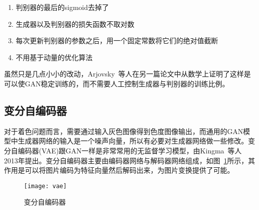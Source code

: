   \begin{enumerate}
    \item 判别器的最后的sigmoid去掉了
    \item 生成器以及判别器的损失函数不取对数
    \item 每次更新判别器的参数之后，用一个固定常数将它们的绝对值截断
    \item 不用基于动量的优化算法
  \end{enumerate}

  虽然只是几点小小的改动，Arjovsky~\cite{DBLP:journals/corr/ArjovskyB17}等人在另一篇论文中从数学上证明了这样是可以使GAN稳定训练的，而不需要人工控制生成器与判别器的训练比例。

\subsection{变分自编码器}
\label{sec:2-vae}
  
  对于着色问题而言，需要通过输入灰色图像得到色度图像输出，而通用的GAN模型中生成器网络的输入是一个噪声向量，所以有必要对生成器网络做一些修改。变分自编码器(VAE)跟GAN一样是非常常用的无监督学习模型，由Kingma~\cite{DBLP:journals/corr/KingmaW13}等人2013年提出。变分自编码器主要由编码器网络与解码器网络组成，如图~\ref{fig:vae}所示，其作用是可以将图片编码为特征向量然后解码出来，为图片变换提供了可能。

  \begin{figure}[H]
    \centering
    \texttt{[image: vae]}
    \caption{变分自编码器}
    \label{fig:vae}
  \end{figure}

